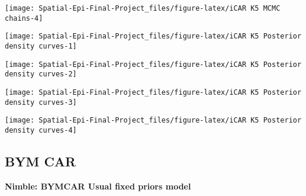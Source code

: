 \documentclass[]{article}
\begin{document}
\begin{center}\texttt{[image: Spatial-Epi-Final-Project\_files/figure-latex/iCAR K5  MCMC chains-4]} \end{center}

\begin{center}\texttt{[image: Spatial-Epi-Final-Project\_files/figure-latex/iCAR K5  Posterior density curves-1]} \end{center}

\begin{center}\texttt{[image: Spatial-Epi-Final-Project\_files/figure-latex/iCAR K5  Posterior density curves-2]} \end{center}

\begin{center}\texttt{[image: Spatial-Epi-Final-Project\_files/figure-latex/iCAR K5  Posterior density curves-3]} \end{center}

\begin{center}\texttt{[image: Spatial-Epi-Final-Project\_files/figure-latex/iCAR K5  Posterior density curves-4]} \end{center}

\hypertarget{bym-car}{%
\subsection{BYM CAR}\label{bym-car}}

\textbf{Nimble: BYMCAR Usual fixed priors model}
\end{document}
